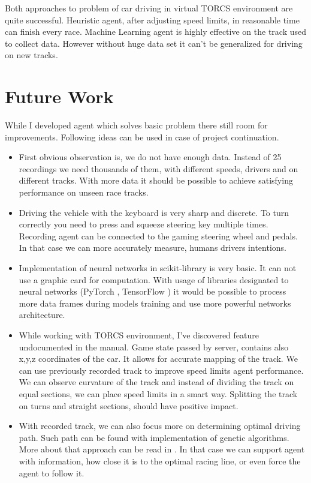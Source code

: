 \documentclass[declaration,shortabstract,english,inz]{iithesis}
\begin{document}
Both approaches to problem of car driving in virtual TORCS environment are quite successful.
Heuristic agent, after adjusting speed limits, in reasonable time can finish every race.
Machine Learning agent is highly effective on the track used to collect data.
However without huge data set it can't be generalized for driving on new tracks.


\section{Future Work}

While I developed agent which solves basic problem there still room for improvements.
Following ideas can be used in case of project continuation.
\begin{itemize}
    \item First obvious observation is, we do not have enough data.
Instead of 25 recordings we need thousands of them, with different speeds, drivers and on different tracks.
With more data it should be possible to achieve satisfying performance on unseen race tracks.

    \item Driving the vehicle with the keyboard is very sharp and discrete.
To turn correctly you need to press and squeeze steering key multiple times.
Recording agent can be connected to the gaming steering wheel and pedals.
In that case we can more accurately measure, humans drivers intentions.

    \item Implementation of neural networks in scikit-library is very basic.
It can not use a graphic card for computation.
With usage of libraries designated to neural networks (PyTorch \cite{py_torch}, TensorFlow \cite{tensor_flow}) it would be possible to process more data frames during models training and use more  powerful networks architecture.

    \item While working with TORCS environment, I've discovered feature undocumented in the manual.
    Game state passed by server, contains also x,y,z coordinates of the car.
    It allows for accurate mapping of the track.
    We can use previously recorded track to improve speed limits agent performance.
    We can observe curvature of the track and instead of dividing the track on equal sections, we can place speed limits in a smart way.
    Splitting the track on turns and straight sections, should have positive impact.

    \item With recorded track, we can also focus more on determining optimal driving path.
    Such path can be found with implementation of genetic algorithms. More about that approach can be read in \cite{genetic-optimal-race-line}.
    In that case we can support agent with information, how close it is to the optimal racing line, or even force the agent to follow it.
    

\end{itemize}
\end{document}
